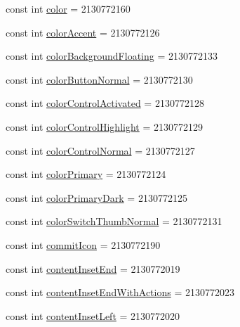 \begin{CompactItemize}
\item 
const int \hyperlink{class__2doo_1_1_droid_1_1_resource_1_1_attribute_42d37e52ccca2e4980a62050209e9fc4}{color} = 2130772160
\item 
const int \hyperlink{class__2doo_1_1_droid_1_1_resource_1_1_attribute_7b0dcd02a0d0d6137f65712a10779c24}{colorAccent} = 2130772126
\item 
const int \hyperlink{class__2doo_1_1_droid_1_1_resource_1_1_attribute_80aadbbb36f4a40e8b7be0fd9c118741}{colorBackgroundFloating} = 2130772133
\item 
const int \hyperlink{class__2doo_1_1_droid_1_1_resource_1_1_attribute_c68076063ba4944927fbc3923174c1e5}{colorButtonNormal} = 2130772130
\item 
const int \hyperlink{class__2doo_1_1_droid_1_1_resource_1_1_attribute_428d1a3e9b0170b449dfc7d51d142658}{colorControlActivated} = 2130772128
\item 
const int \hyperlink{class__2doo_1_1_droid_1_1_resource_1_1_attribute_e1f99f06a20b4b5a1297c7ad25a42171}{colorControlHighlight} = 2130772129
\item 
const int \hyperlink{class__2doo_1_1_droid_1_1_resource_1_1_attribute_125525ed34185e5b1153141c79cea9e5}{colorControlNormal} = 2130772127
\item 
const int \hyperlink{class__2doo_1_1_droid_1_1_resource_1_1_attribute_9e821045460b886be36cf03de34e4675}{colorPrimary} = 2130772124
\item 
const int \hyperlink{class__2doo_1_1_droid_1_1_resource_1_1_attribute_5c64ff68d05a99b6080ef27b779bd4d3}{colorPrimaryDark} = 2130772125
\item 
const int \hyperlink{class__2doo_1_1_droid_1_1_resource_1_1_attribute_f419879108000e85f8d11c2874e7879e}{colorSwitchThumbNormal} = 2130772131
\item 
const int \hyperlink{class__2doo_1_1_droid_1_1_resource_1_1_attribute_3fde57e408b7ecbf5d3f9a4272beb365}{commitIcon} = 2130772190
\item 
const int \hyperlink{class__2doo_1_1_droid_1_1_resource_1_1_attribute_744fe3c72e1d3144cf1f5754e41ed85d}{contentInsetEnd} = 2130772019
\item 
const int \hyperlink{class__2doo_1_1_droid_1_1_resource_1_1_attribute_a7ff5959b2a532b96b2f92f9da8a28e3}{contentInsetEndWithActions} = 2130772023
\item 
const int \hyperlink{class__2doo_1_1_droid_1_1_resource_1_1_attribute_7ce3e88c3f9c3a8b25e1415b41dae664}{contentInsetLeft} = 2130772020
\item 

\end{CompactItemize}
